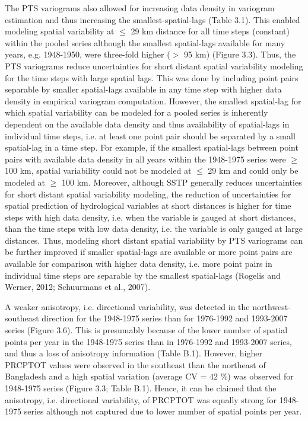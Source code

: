 The PTS variograms also allowed for increasing data density in variogram estimation and thus increasing the smallest-spatial-lags (Table 3.1). This enabled modeling spatial variability at $\leq$ 29 km distance for all time steps (constant) within the pooled series although the smallest spatial-lags available for many years, e.g. 1948-1950, were three-fold higher ($>$ 95 km) (Figure 3.3). Thus, the PTS variograms reduce uncertainties for short distant spatial variability modeling for the time steps with large spatial lags. This was done by including point pairs separable by smaller spatial-lags available in any time step with higher data density in empirical variogram computation. However, the smallest spatial-lag for which spatial variability can be modeled for a pooled series is inherently dependent on the available data density and thus availability of spatial-lags in individual time steps, i.e. at least one point pair should be separated by a small spatial-lag in a time step. For example, if the smallest spatial-lags between point pairs with available data density in all years within the 1948-1975 series were $\geq$ 100 km, spatial variability could not be modeled at $\leq$ 29 km and could only be modeled at $\geq$ 100 km. Moreover, although SSTP generally reduces uncertainties for short distant spatial variability modeling, the reduction of uncertainties for spatial prediction of hydrological variables at short distances is higher for time steps with high data density, i.e. when the variable is gauged at short distances, than the time steps with low data density, i.e. the variable is only gauged at large distances. Thus, modeling short distant spatial variability by PTS variograms can be further improved if smaller spatial-lags are available or more point pairs are available for comparison with higher data density, i.e. more point pairs in individual time steps are separable by the smallest spatial-lags (Rogelis and Werner, 2012; Schuurmans et al., 2007).

A weaker anisotropy, i.e. directional variability, was detected in the northwest-southeast direction for the 1948-1975 series than for 1976-1992 and 1993-2007 series (Figure 3.6). This is presumably because of the lower number of spatial points per year in the 1948-1975 series than in 1976-1992 and 1993-2007 series, and thus a loss of anisotropy information (Table B.1). However, higher PRCPTOT values were observed in the southeast than the northeast of Bangladesh and a high spatial variation (average CV = 42 \%) was observed for 1948-1975 series (Figure 3.3; Table B.1). Hence, it can be claimed that the anisotropy, i.e. directional variability, of PRCPTOT was equally strong for 1948-1975 series although not captured due to lower number of spatial points per year.

